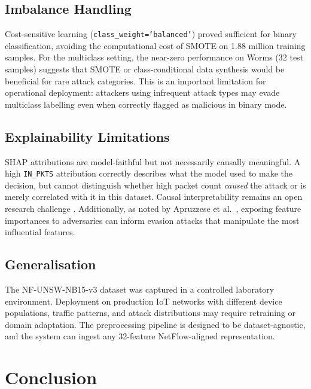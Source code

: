 \documentclass[12pt,a4paper]{article}
\begin{document}
\subsection{Imbalance Handling}

Cost-sensitive learning (\texttt{class\_weight=`balanced'}) proved sufficient for
binary classification, avoiding the computational cost of SMOTE on 1.88 million
training samples. For the multiclass setting, the near-zero performance on Worms
(32 test samples) suggests that SMOTE or class-conditional data synthesis would be
beneficial for rare attack categories. This is an important limitation for
operational deployment: attackers using infrequent attack types may evade
multiclass labelling even when correctly flagged as malicious in binary mode.

\subsection{Explainability Limitations}

SHAP attributions are model-faithful but not necessarily causally meaningful.
A high \texttt{IN\_PKTS} attribution correctly describes what the model used to
make the decision, but cannot distinguish whether high packet count \emph{caused}
the attack or is merely correlated with it in this dataset. Causal interpretability
remains an open research challenge \cite{doshi2017towards}. Additionally, as noted
by Apruzzese et al.\ \cite{apruzzese2022xai}, exposing feature importances to
adversaries can inform evasion attacks that manipulate the most influential features.

\subsection{Generalisation}

The NF-UNSW-NB15-v3 dataset was captured in a controlled laboratory environment.
Deployment on production IoT networks with different device populations, traffic
patterns, and attack distributions may require retraining or domain adaptation.
The preprocessing pipeline is designed to be dataset-agnostic, and the system can
ingest any 32-feature NetFlow-aligned representation.

\section{Conclusion}
\label{sec:conclusion}
\end{document}
